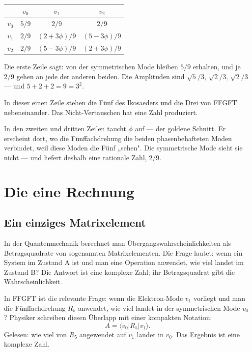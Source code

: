 \documentclass[12pt,oneside]{book}
\begin{document}
\begin{center}
\begin{tabular}{c|ccc}
\toprule
& $v_0$ & $v_1$ & $v_2$ \\
\midrule
$v_0$ & $5/9$ & $2/9$ & $2/9$ \\
$v_1$ & $2/9$ & $(2+3\phi)/9$ & $(5-3\phi)/9$ \\
$v_2$ & $2/9$ & $(5-3\phi)/9$ & $(2+3\phi)/9$ \\
\bottomrule
\end{tabular}
\end{center}

Die erste Zeile sagt: von der symmetrischen Mode bleiben $5/9$ erhalten, und je $2/9$ gehen an jede der anderen beiden. Die Amplituden sind $\sqrt{5}/3$, $\sqrt{2}/3$, $\sqrt{2}/3$ — und $5 + 2 + 2 = 9 = 3^2$.

In dieser einen Zeile stehen die Fünf des Ikosaeders und die Drei von FFGFT nebeneinander. Das Nicht-Vertauschen hat eine Zahl produziert.

In den zweiten und dritten Zeilen taucht $\phi$ auf — der goldene Schnitt. Er erscheint dort, wo die Fünffachdrehung die beiden phasenbehafteten Moden verbindet, weil diese Moden die Fünf „sehen". Die symmetrische Mode sieht sie nicht — und liefert deshalb eine rationale Zahl, $2/9$.

\chapter{Die eine Rechnung}

\section{Ein einziges Matrixelement}

In der Quantenmechanik berechnet man Über\-gangs\-wahr\-schein\-lich\-keiten als Betragsquadrate von sogenannten Matrixelementen. Die Frage lautet: wenn ein System im Zustand A ist und man eine Operation anwendet, wie viel landet im Zustand B? Die Antwort ist eine komplexe Zahl; ihr Betragsquadrat gibt die Wahrscheinlichkeit.

In FFGFT ist die relevante Frage: wenn die Elektron-Mode $v_1$ vorliegt und man die Fünffachdrehung $R_5$ anwendet, wie viel landet in der symmetrischen Mode $v_0$? Physiker schreiben diesen Überlapp mit einer kompakten Notation:
\[
A = \langle v_0 | R_5 | v_1 \rangle.
\]
Gelesen: wie viel von $R_5$ angewendet auf $v_1$ landet in $v_0$. Das Ergebnis ist eine komplexe Zahl.
\end{document}
